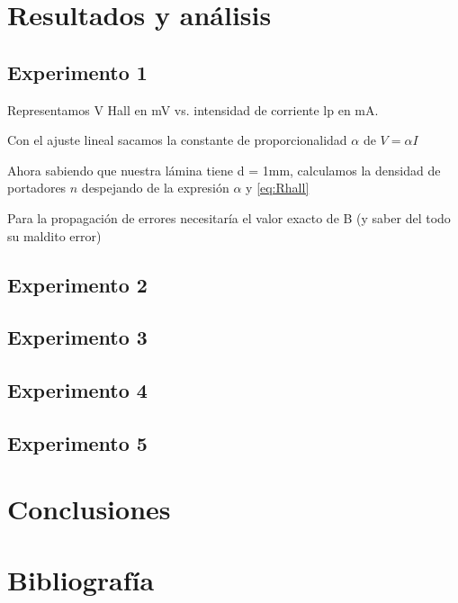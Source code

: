 

\section{Resultados y análisis}

\subsection{Experimento 1}

Representamos V Hall en mV vs. intensidad de corriente lp en mA.

Con el ajuste lineal sacamos la constante de proporcionalidad $\alpha$ de $V = \alpha I$

Ahora sabiendo que nuestra lámina tiene d = 1mm, calculamos la densidad de portadores $n$ despejando de la expresión $\alpha $ y \eqref{eq:Rhall}

Para la propagación de errores necesitaría el valor exacto de B (y saber del todo su maldito error)


\subsection{Experimento 2}



\subsection{Experimento 3}



\subsection{Experimento 4}



\subsection{Experimento 5}




\section{Conclusiones}


\section{Bibliografía}






